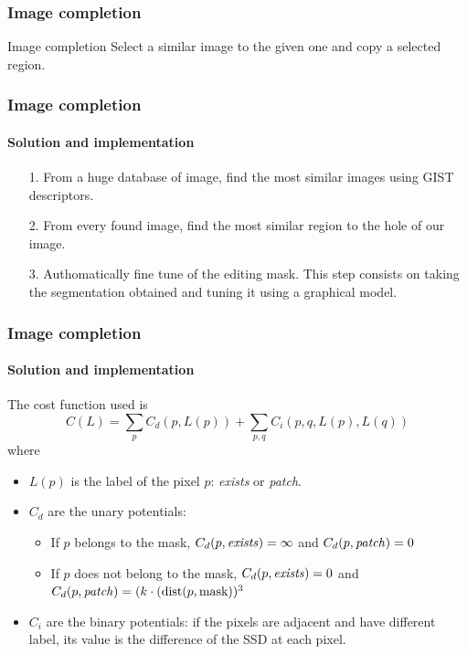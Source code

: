 \documentclass[11pt]{beamer}
\begin{document}
\begin{frame}
\frametitle{Image completion}

\begin{block}{Image completion}
Select a similar image to the given one and copy a selected region.
\end{block}

\end{frame}

\begin{frame}
\frametitle{Image completion}
\framesubtitle{Solution and implementation}
\begin{itemize}
\item [1.]  From a huge database of image, find the most similar images using GIST descriptors.
\item [2.] From every found image, find the most similar region to the hole of our image.
\item [3.] Authomatically fine tune of the editing mask. This step consists on taking the segmentation obtained  and tuning it using a graphical model.
\end{itemize}
\end{frame}

\begin{frame}
\frametitle{Image completion}
\framesubtitle{Solution and implementation}
The cost function used is
\begin{equation*}
C(L) = \sum_pC_d(p, L(p)) + \sum_{p, q}C_i(p, q, L(p), L(q))
\end{equation*}
where 
\begin{itemize}
\item $L(p)$ is the label of the pixel $p$: \emph{exists} or \emph{patch}.
\item $C_d$ are the unary potentials:
\begin{itemize}
\item If $p$ belongs to the mask, $C_d(p, \text{\emph{exists}}) = \infty$ and $C_d(p, \text{\emph{patch}}) = 0$
\item If $p$ does not belong to the mask, $C_d(p, \text{\emph{exists}}) = 0$ and $C_d(p, \text{\emph{patch}}) = (k\cdot(\text{dist}(p, \text{mask}))^3$
\end{itemize}


\item $C_i$ are the binary potentials: if the pixels are adjacent and have different label, its value is the difference of the SSD at each pixel.
\end{itemize}
\end{frame}
\end{document}
